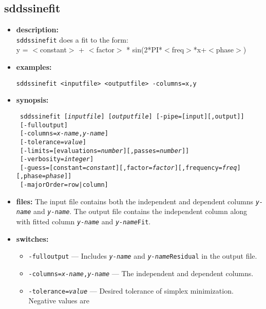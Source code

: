 \newpage 
\subsection{sddssinefit} 
\label{sddssinefit} 
 
\begin{itemize} 
\item {\bf description:} \hspace*{1mm}\\ 
{\tt sddssinefit} does a fit to the form:\\
y = $<$constant$>$ + $<$factor$>$ * sin(2*PI*$<$freq$>$*x+$<$phase$>$)
\item {\bf examples:} 
\begin{flushleft}
{\tt sddssinefit <inputfile> <outputfile> -columns=x,y }
\end{flushleft} 
\item {\bf synopsis:}  
\begin{flushleft}
{\tt 
sddssinefit [{\em inputfile}] [{\em outputfile}] [-pipe=[input][,output]] \\ \
{}[-fulloutput] \\ \
{}[-columns={\em x-name},{\em y-name}] \\ \
{}[-tolerance={\em value}] \\ \
{}[-limits=[evaluations={\em number}][,passes={\em number}]] \\ \
{}[-verbosity={\em integer}] \\ \
{}[-guess=[constant={\em constant}][,factor={\em factor}][,frequency={\em freq}][,phase={\em phase}]] \\ \
{}[-majorOrder=row|column]}
\end{flushleft} 
\item {\bf files:} 
The input file contains both the independent and dependent columns {\tt {\em y-name}} and {\tt {\em y-name}}. The output file contains the independent column along with fitted column {\tt {\em y-name}} and {\tt {\em y-name}Fit}.
\item {\bf switches:} 
    \begin{itemize} 
    \item {\tt -fulloutput} --- Includes {\tt {\em y-name}} and {\tt {\em y-name}Residual} in the output file.
    \item {\tt -columns={\em x-name},{\em y-name}} --- The independent and dependent columns.
    \item {\tt -tolerance={\em value}} --- Desired tolerance of simplex minimization. Negative values are\\

\end{itemize}
\end{itemize}
